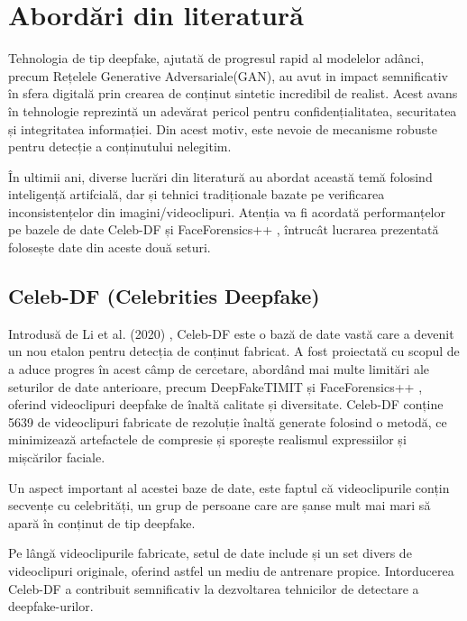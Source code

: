 \chapter{Abordări din literatură}

Tehnologia de tip deepfake, ajutată de progresul rapid al modelelor adânci, precum Rețelele Generative Adversariale(GAN), au avut in impact semnificativ în sfera digitală prin crearea de conținut sintetic incredibil de realist. Acest avans în tehnologie reprezintă un adevărat pericol pentru confidențialitatea, securitatea și integritatea informației. Din acest motiv, este nevoie de mecanisme robuste pentru detecție a conținutului nelegitim. 

În ultimii ani, diverse lucrări din literatură au abordat această temă folosind inteligență artifcială, dar și tehnici tradiționale bazate pe verificarea inconsistențelor din imagini/videoclipuri. Atenția va fi acordată performanțelor pe bazele de date Celeb-DF \cite{li2020celeb} și FaceForensics++ \cite{rössler2019faceforensics}, întrucât lucrarea prezentată folosește date din aceste două seturi.

\section{Celeb-DF (Celebrities Deepfake)}

Introdusă de Li et al. (2020) \cite{li2020celeb}, Celeb-DF este o bază de date vastă care a devenit un nou etalon pentru detecția de conținut fabricat. A fost proiectată cu scopul de a aduce progres în acest câmp de cercetare, abordând mai multe limitări ale seturilor de date anterioare, precum DeepFakeTIMIT \cite{khan2021adversarially} și FaceForensics++ \cite{rössler2019faceforensics}, oferind videoclipuri deepfake de înaltă calitate și diversitate. Celeb-DF conține 5639 de videoclipuri fabricate de rezoluție înaltă generate folosind o metodă, ce minimizează artefactele de compresie și sporește realismul expressiilor și mișcărilor faciale. 

Un aspect important al acestei baze de date, este faptul că videoclipurile conțin secvențe cu celebrități, un grup de persoane care are șanse mult mai mari să apară în conținut de tip deepfake.

Pe lângă videoclipurile fabricate, setul de date include și un set divers de videoclipuri originale, oferind astfel un mediu de antrenare propice. Intorducerea Celeb-DF a contribuit semnificativ la dezvoltarea tehnicilor de detectare a deepfake-urilor.

